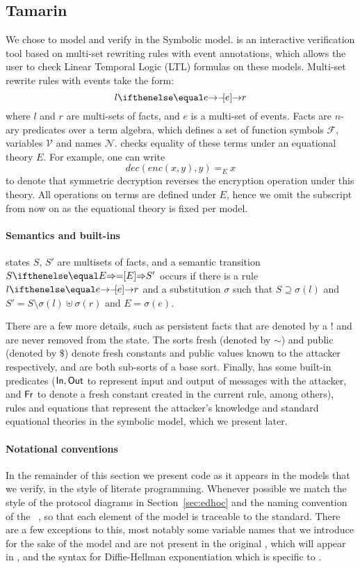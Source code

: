 \subsection{Tamarin}
\label{sec:tamarin}
We chose \mTamarin{} to model and verify \mEdhoc{} in the Symbolic model.
%
\mTamarin{} is an interactive verification tool based on multi-set rewriting rules
with event annotations, which allows the user to check Linear Temporal Logic
(LTL) formulas on these models.
%
Multi-set rewrite rules with events take the form:
%
\[ l \ifarrow[e] r \]
%
where $l$ and $r$ are multi-sets of facts, and $e$ is a multi-set of events.
%
Facts are $n$-ary predicates over a term algebra, which defines a set of function
symbols $\mathcal F$, variables $\mathcal V$ and names $\mathcal N$. \mTamarin{}
checks equality of these terms under an equational theory $E$. For example,
one can write
%
\[ dec(enc(x,y),y) =_E x \]
%
to denote that symmetric decryption reverses the encryption operation under this theory.
All operations on terms are defined under $E$, hence we omit the
subscript from now on as the equational theory is fixed per model.

\paragraph{Semantics and built-ins} \phantom{} \mTamarin{} states
$S$, $S'$ are multisets of facts, and a semantic transition $S \semarrow[E] S'$
occurs if there is a rule $l \ifarrow[e] r$ and a substitution $\sigma$ such
that $S \supseteq \sigma(l)$ and $S' = S \setminus \sigma(l) \uplus \sigma(r)$
and $E = \sigma(e)$.

There are a few more details, such as persistent facts that are denoted by a $!$
and are never removed from the state.
%
The sorts fresh (denoted by $\sim$) and public (denoted by $\$$) denote fresh
constants and public values known to the attacker respectively, and are both
sub-sorts of a base sort.
%
Finally, \mTamarin{} has some built-in predicates ($\mathsf{In},
\mathsf{Out}$ to represent input and output of messages with the attacker,
and
$\mathsf{Fr}$ to denote a fresh constant created in the current rule, among
others), rules and equations that represent the attacker's knowledge
and standard equational theories in the symbolic model,
which we present later.

\paragraph{Notational conventions} In the remainder of this section we present
\mTamarin{} code as it appears in the models that we verify, in the style of
literate programming.  Whenever possible we match the style of the protocol
diagrams in Section~\ref{sec:edhoc} and the naming convention of the \mEdhoc{}
\mSpec~\cite{selander-lake-edhoc-01}, so that each element of the model is
traceable to the standard.  There are a few exceptions to this, most notably
some variable names that we introduce for the sake of the \mTamarin{} model and are
not present in the original \mSpec{}, which will appear in , and
the syntax for Diffie-Hellman exponentiation which is specific to \mTamarin{}.

